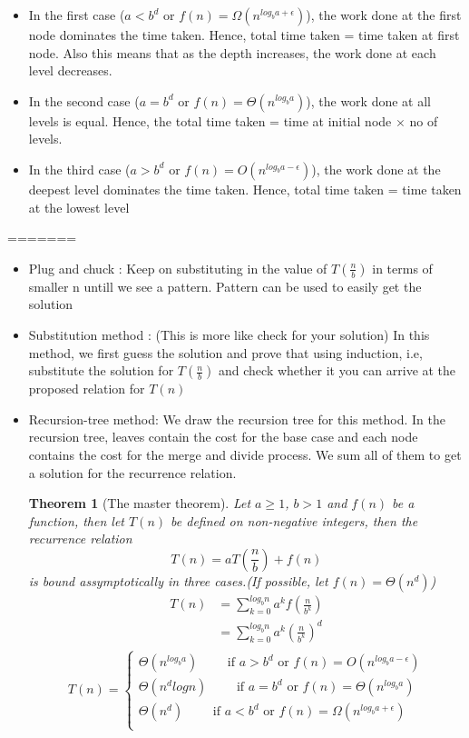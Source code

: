 \documentclass{article}
\newtheorem*{theorem}{Theorem}
\begin{document}
\begin{enumerate}
		\begin{itemize}
		\item In the first case ($a<b^d\text{ or }f(n)= \Omega(n^{log_ba+\epsilon})$), the work done at the first node dominates the time taken. Hence, total time taken = time taken at first node. Also this means that as the depth increases, the work done at each level decreases. 
		\item In the second case ($a=b^d\text{ or }f(n)= \Theta(n^{log_ba})$), the work done at all levels is equal. Hence, the total time taken = time at initial node $\times$ no of levels.
		\item In the third case ($a>b^d\text{ or }f(n)= O(n^{log_ba-\epsilon})$), the work done at the deepest level dominates the time taken. Hence, total time taken = time taken at the lowest level
		\end{itemize}
=======
	\begin{itemize}
	\item Plug and chuck : Keep on substituting in the value of $T(\frac{n}{b})$ in terms of smaller n untill we see a pattern. Pattern can be used to easily get the solution
	\item Substitution method : (This is more like check for your solution) In this method, we first guess the solution and prove that using induction, i.e, substitute the solution for $T(\frac{n}{b})$ and check whether it you can arrive at the proposed relation for $T(n)$
	\item Recursion-tree method: We draw the recursion tree for this method. In the recursion tree, leaves contain the cost for the base case and each node contains the cost for the merge and divide process. We sum all of them to get a solution for the recurrence relation. 

	\begin{theorem}[The master theorem]
	Let $a\geq 1$, $b>1$ and $f(n)$ be a function, then let $T(n)$ be defined on non-negative integers, then the recurrence relation
	\[T(n) = aT(\frac{n}{b}) + f(n) \] is bound assymptotically in three cases.(If possible, let $f(n)= \Theta(n^d)$)
	\begin{align*}
		T(n) &= \sum_{k=0}^{log_bn} a^k f(\frac{n}{b^k})\\
			&= \sum_{k=0}^{log_bn} a^k (\frac{n}{b^k})^d\\ 
	\end{align*}
			\[\boxed{{T(n)= 
					\begin{cases}
					\Theta(n^{log_ba}) \qquad \text{ if } a>b^d\text{ or }f(n)= O(n^{log_ba-\epsilon})\\
					\Theta(n^d logn) \qquad \text{ if } a=b^d\text{ or }f(n)= \Theta(n^{log_ba})\\
					\Theta(n^d) \qquad\text{ if } a<b^d\text{ or }f(n)= \Omega(n^{log_ba+\epsilon})\\
					\end{cases}}}	\]
	\end{theorem}


\end{itemize}
\end{enumerate}
\end{document}

